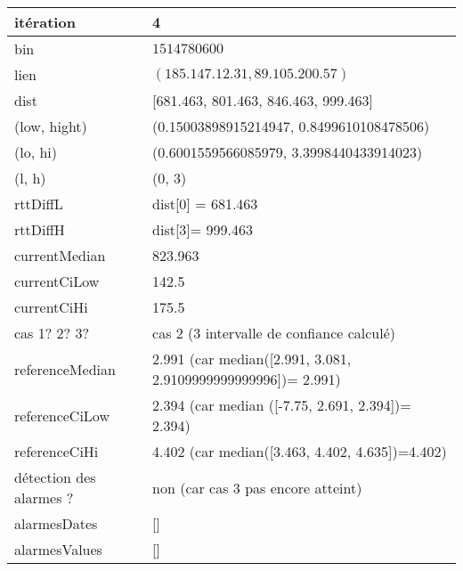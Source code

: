 	\begin{table}[H]
	\centering
	
	\begin{tabularx}{\linewidth}{|l|X| }
		\hline
		itération & 4	\\ \hline
		bin & $1514780600$ \\ \hline
		lien & $(185.147.12.31, 89.105.200.57)$  \\ \hline
		dist& [681.463, 801.463, 846.463, 999.463]	\\ \hline
		(low, hight)& (0.15003898915214947, 0.8499610108478506) 	\\ \hline
		(lo, hi)&(0.6001559566085979, 3.3998440433914023)  \\ \hline
		(l, h) & (0, 3) 	\\ \hline
		rttDiffL& dist[0] = 681.463	\\ \hline
		rttDiffH& dist[3]= 999.463	\\ \hline
		currentMedian& 823.963	\\ \hline
		currentCiLow& 142.5 	\\ \hline
		currentCiHi& 175.5	\\ \hline
		cas 1? 2? 3?& cas 2 (3 intervalle de confiance calculé)  \\ \hline
		referenceMedian& 2.991 (car median([2.991, 3.081, 2.9109999999999996])= 2.991)	\\ \hline
		referenceCiLow& 2.394 (car median ([-7.75, 2.691, 2.394])= 2.394)	\\ \hline
		referenceCiHi& 4.402 (car median([3.463, 4.402, 4.635])=4.402)	\\ \hline
		détection des alarmes ?& non (car cas 3 pas  encore atteint)	\\ \hline
		alarmesDates& []	\\ \hline
		alarmesValues& []	\\ \hline
		
	\end{tabularx}
\end{table}







